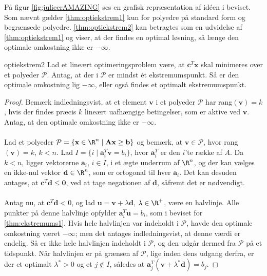%

%
På figur \ref{fig:julieerAMAZING} ses en grafisk repræsentation af idéen i beviset.
Som nævnt gælder \ref{thm:optiekstrem1} kun for polyedre på standard form og begrænsede polyedre. 
\ref{thm:optiekstrem2} kan betragtes som en udvidelse af \ref{thm:optiekstrem1} og viser, at der findes en optimal løsning, så længe den optimale omkostning ikke er $-\infty$. 
%
\begin{thm}{}{optiekstrem2}
Lad et lineært optimeringsproblem være, at $\textbf{c}^T \textbf{x}$ skal minimeres over et polyeder $\mathcal{P}$. 
Antag, at der i $\mathcal{P}$ er mindst ét ekstremumspunkt. 
Så er den optimale omkostning lig $- \infty$, eller også findes et optimalt ekstremumspunkt. 
\end{thm}
%
%
\begin{proof}
Bemærk indledningsvist, at et element $\textbf{v}$ i et polyeder $\mathcal{P}$ har rang$(\textbf{v})=k$, hvis der findes præcis $k$ lineært uafhængige betingelser, som er aktive ved $\textbf{v}$. 
Antag, at den optimale omkostning ikke er $-\infty$. 
\\\\
%
Lad et polyeder $\mathcal{P} = \{\textbf{x} \in \R^n \mid \textbf{A}\textbf{x} \geq \textbf{b} \}$ og bemærk, at $\textbf{v} \in \mathcal{P}$, hvor rang$(\textbf{v})=k$, $k < n$. 
Lad $I = \{ i \mid \textbf{a}^T_i \textbf{v} = b_i \}$, hvor $\textbf{a}^T_i$ er den $i$'te række af $A$. 
Da $k < n$, ligger vektorerne $\textbf{a}_i$, $i \in I$, i et ægte underrum af $ \R^n$, og der kan vælges en ikke-nul vektor $\textbf{d} \in \R^n$, som er ortogonal til hver $\textbf{a}_i$. 
Det kan desuden antages, at $\textbf{c}^T \textbf{d} \leq \textbf{0}$, ved at tage negationen af $\textbf{d}$, såfremt det er nødvendigt. 
\\\\
%
Antag nu, at $\textbf{c}^T \textbf{d} < 0$, og lad $\textbf{u} = \textbf{v} + \lambda \textbf{d}$, $ \lambda \in \R^+$, være en halvlinje. 
Alle punkter på denne halvlinje opfylder $\textbf{a}^T_i \textbf{u} = b_i$, som i beviset for \ref{thm:ekstremums1}. 
Hvis hele halvlinjen var indeholdt i $\mathcal{P}$, havde den optimale omkostning været $- \infty $; men det antages indledningsvist, at denne værdi er endelig. 
Så er ikke hele halvlinjen indeholdt i $\mathcal{P}$, og den udgår dermed fra $\mathcal{P}$ på et tidspunkt. 
Når halvlinjen er på grænsen af $\mathcal{P}$, lige inden dens udgang derfra, er der et optimalt $ \lambda^* > 0$ og et $j \notin I$, således at $\textbf{a}^T_j (\textbf{v} + \lambda^* \textbf{d} ) = b_j $.

\end{proof}
